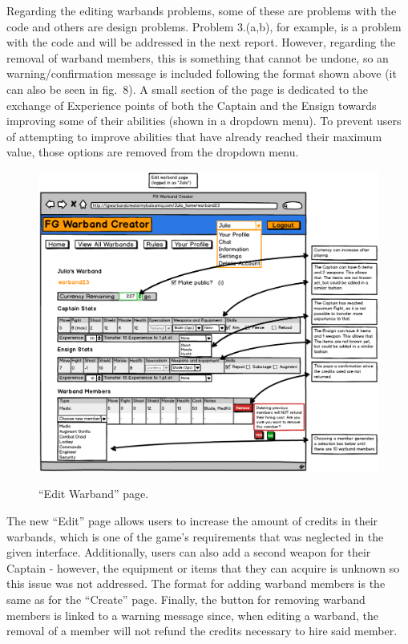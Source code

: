 \documentclass[12pt,a4paper]{article}
\begin{document}
Regarding the editing warbands problems, some of these are problems with the code and others are design problems. Problem 3.(a,b), for example, is a problem with the code and will be addressed in the next report. However, regarding the removal of warband members, this is something that cannot be undone, so an warning/confirmation message is included following the format shown above (it can also be seen in fig.~8). A small section of the page is dedicated to the exchange of Experience points of both the Captain and the Ensign towards improving some of their abilities (shown in a dropdown menu). To prevent users of attempting to improve abilities that have already reached their maximum value, those options are removed from the dropdown menu.

\begin{figure}[h!]
 \centering
 \includegraphics[width=1\textwidth]{img/edit_restricted}
 \label{fig:8}
 \caption{``Edit Warband'' page.}
\end{figure}

The new ``Edit'' page allows users to increase the amount of credits in their warbands, which is one of the game's requirements that was neglected in the given interface. Additionally, users can also add a second weapon for their Captain - however, the equipment or items that they can acquire is unknown so this issue was not addressed. The format for adding warband members is the same as for the ``Create'' page. Finally, the button for removing warband members is linked to a warning message since, when editing a warband, the removal of a member will not refund the credits necessary to hire said member.
\end{document}
